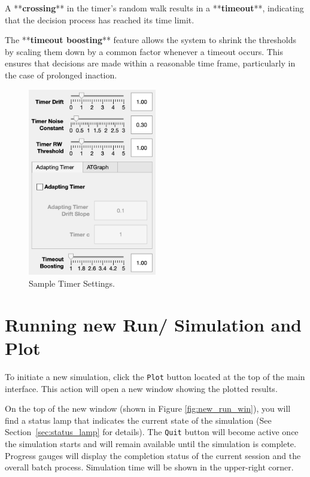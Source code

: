 A **\textbf{crossing}** in the timer's random walk results in a **\textbf{timeout}**, indicating that the decision process has reached its time limit.

The **\textbf{timeout boosting}** feature allows the system to shrink the thresholds by scaling them down by a common factor whenever a timeout occurs. This ensures that decisions are made within a reasonable time frame, particularly in the case of prolonged inaction.

\begin{figure}[H]
    \centering
    \includegraphics[width=0.5\textwidth]{figs/timer_settings.png}
    \caption{Sample Timer Settings.}
    \label{fig:timer_settings}
\end{figure}

\section{Running new Run/ Simulation and Plot} \label{sec:new_run}

To initiate a new simulation, click the \texttt{Plot} button located at the top of the main interface. This action will open a new window showing the plotted results.

On the top of the new window (shown in Figure \ref{fig:new_run_win}), you will find a status lamp that indicates the current state of the simulation (See Section~\ref{sec:status_lamp} for details). The \texttt{Quit} button will become active once the simulation starts and will remain available until the simulation is complete. Progress gauges will display the completion status of the current session and the overall batch process. Simulation time will be shown in the upper-right corner.

